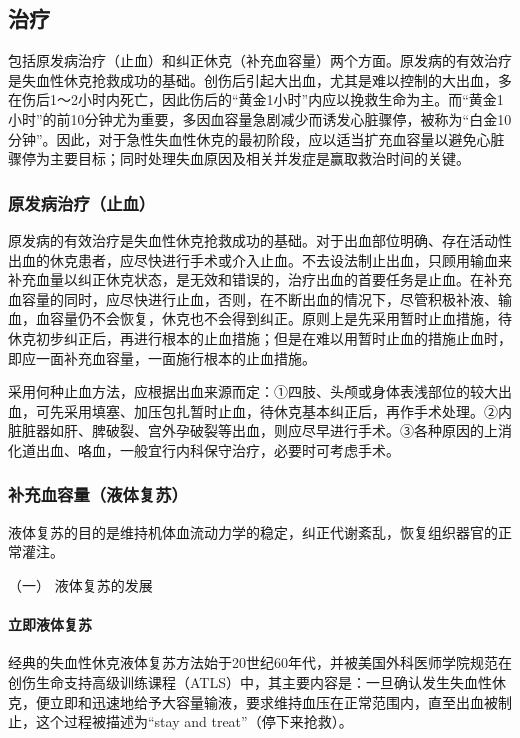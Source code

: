 \subsection{治疗}

包括原发病治疗（止血）和纠正休克（补充血容量）两个方面。原发病的有效治疗是失血性休克抢救成功的基础。创伤后引起大出血，尤其是难以控制的大出血，多在伤后1～2小时内死亡，因此伤后的“黄金1小时”内应以挽救生命为主。而“黄金1小时”的前10分钟尤为重要，多因血容量急剧减少而诱发心脏骤停，被称为“白金10分钟”。因此，对于急性失血性休克的最初阶段，应以适当扩充血容量以避免心脏骤停为主要目标；同时处理失血原因及相关并发症是赢取救治时间的关键。

\subsubsection{原发病治疗（止血）}

原发病的有效治疗是失血性休克抢救成功的基础。对于出血部位明确、存在活动性出血的休克患者，应尽快进行手术或介入止血。不去设法制止出血，只顾用输血来补充血量以纠正休克状态，是无效和错误的，治疗出血的首要任务是止血。在补充血容量的同时，应尽快进行止血，否则，在不断出血的情况下，尽管积极补液、输血，血容量仍不会恢复，休克也不会得到纠正。原则上是先采用暂时止血措施，待休克初步纠正后，再进行根本的止血措施；但是在难以用暂时止血的措施止血时，即应一面补充血容量，一面施行根本的止血措施。

采用何种止血方法，应根据出血来源而定：①四肢、头颅或身体表浅部位的较大出血，可先采用填塞、加压包扎暂时止血，待休克基本纠正后，再作手术处理。②内脏脏器如肝、脾破裂、宫外孕破裂等出血，则应尽早进行手术。③各种原因的上消化道出血、咯血，一般宜行内科保守治疗，必要时可考虑手术。

\subsubsection{补充血容量（液体复苏）}

液体复苏的目的是维持机体血流动力学的稳定，纠正代谢紊乱，恢复组织器官的正常灌注。

\hypertarget{text00061.htmlux5cux23CHP2-4-3-2-1}{}
（一） 液体复苏的发展

\paragraph{立即液体复苏}

经典的失血性休克液体复苏方法始于20世纪60年代，并被美国外科医师学院规范在创伤生命支持高级训练课程（ATLS）中，其主要内容是：一旦确认发生失血性休克，便立即和迅速地给予大容量输液，要求维持血压在正常范围内，直至出血被制止，这个过程被描述为“stay
and treat”（停下来抢救）。


